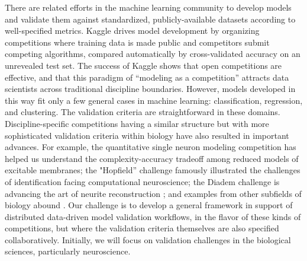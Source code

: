 \documentclass[11pt,letterpaper]{article}
\begin{document}
There are related efforts in the machine learning community to develop models and validate them against standardized, publicly-available datasets according to well-specified metrics. Kaggle \cite{kaggle_url} drives model development by organizing competitions where training data is made public and competitors submit competing algorithms, compared automatically by cross-validated accuracy on an unrevealed test set. The success of Kaggle \cite{carpenter_may_2011} shows that open competitions are effective, and that this paradigm of ``modeling as a competition'' attracts data scientists across traditional discipline boundaries. However, models developed in this way fit only a few general cases in machine learning: classification, regression, and clustering. The validation criteria are straightforward in these domains. Discipline-specific competitions having a similar structure but with more sophisticated validation criteria within biology have also resulted in important advances. For example, the quantitative single neuron modeling competition \cite{jolivet_quantitative_2008} has helped us understand the complexity-accuracy tradeoff among reduced models of excitable membranes; the "Hopfield'' challenge \cite{hopfield_what_2000} famously illustrated the challenges of identification facing computational neuroscience; the Diadem challenge is advancing the art of neurite reconstruction \cite{diadem_url}; and examples from other subfields of biology abound \cite{dream_url}. Our challenge is to develop a general framework in support of distributed data-driven model validation workflows, in the flavor of these kinds of competitions, but where the validation criteria themselves are also specified collaboratively. Initially, we will focus on validation challenges in the biological sciences, particularly neuroscience. 

\end{document}
